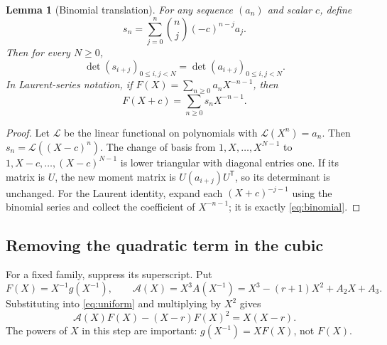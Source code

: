 \documentclass[11pt,letterpaper]{article}
\numberwithin{equation}{section}
\newtheorem{lemma}[theorem]{Lemma}
\theoremstyle{definition}
\begin{document}
\begin{lemma}[Binomial translation]
\label{lem:binomial}
For any sequence \((a_n)\) and scalar \(c\), define
\begin{equation}
 s_n=\sum_{j=0}^n\binom nj(-c)^{n-j}a_j.
 \label{eq:binomial}
\end{equation}
Then for every \(N\geq0\),
\begin{equation}
 \det(s_{i+j})_{0\leq i,j<N}
 =\det(a_{i+j})_{0\leq i,j<N}.
 \label{eq:invariance}
\end{equation}
In Laurent-series notation, if \(F(X)=\sum_{n\geq0}a_nX^{-n-1}\), then
\begin{equation}
 F(X+c)=\sum_{n\geq0}s_nX^{-n-1}.
 \label{eq:Laurenttranslate}
\end{equation}
\end{lemma}
\begin{proof}
Let \(\mathscr L\) be the linear functional on polynomials with
\(\mathscr L(X^n)=a_n\). Then \(s_n=\mathscr L((X-c)^n)\). The change of
basis from \(1,X,\ldots,X^{N-1}\) to
\(1,X-c,\ldots,(X-c)^{N-1}\) is lower triangular with diagonal entries one.
If its matrix is \(U\), the new moment matrix is
\(U(a_{i+j})U^{\mathsf T}\), so its determinant is unchanged.
For the Laurent identity, expand each \((X+c)^{-j-1}\) using the binomial
series and collect the coefficient of \(X^{-n-1}\); it is exactly
\eqref{eq:binomial}.
\end{proof}

\subsection{Removing the quadratic term in the cubic}

For a fixed family, suppress its superscript. Put
\begin{equation}
 F(X)=X^{-1}g(X^{-1}),\qquad
 \mathcal A(X)=X^3A(X^{-1})=X^3-(r+1)X^2+A_2X+A_3.
\end{equation}
Substituting into \eqref{eq:uniform} and multiplying by \(X^2\) gives
\begin{equation}
 \mathcal A(X)F(X)-(X-r)F(X)^2=X(X-r).
 \label{eq:Laurentquadratic}
\end{equation}
The powers of \(X\) in this step are important: \(g(X^{-1})=XF(X)\),
not \(F(X)\).
\end{document}
